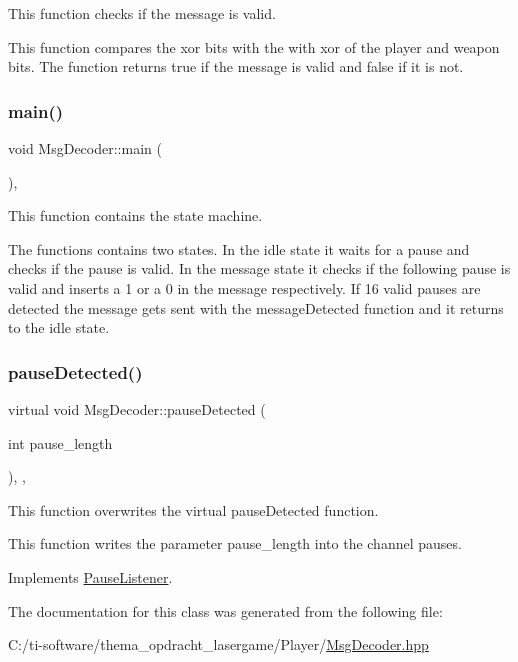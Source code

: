 This function checks if the message is valid. 

This function compares the xor bits with the with xor of the player and weapon bits. The function returns true if the message is valid and false if it is not. \mbox{\label{class_msg_decoder_a0bf9b7579b386b8c9e18a9c606e80604}} 
\subsubsection{\texorpdfstring{main()}{main()}}
{\footnotesize\ttfamily void Msg\+Decoder\+::main (\begin{DoxyParamCaption}{ }\end{DoxyParamCaption})\hspace{0.3cm}{\ttfamily [inline]}, {\ttfamily [override]}}



This function contains the state machine. 

The functions contains two states. In the idle state it waits for a pause and checks if the pause is valid. In the message state it checks if the following pause is valid and inserts a 1 or a 0 in the message respectively. If 16 valid pauses are detected the message gets sent with the message\+Detected function and it returns to the idle state. \mbox{\label{class_msg_decoder_ac83f1179595fbd34295668baf17385fc}} 
\subsubsection{\texorpdfstring{pause\+Detected()}{pauseDetected()}}
{\footnotesize\ttfamily virtual void Msg\+Decoder\+::pause\+Detected (\begin{DoxyParamCaption}\item[{int}]{pause\+\_\+length }\end{DoxyParamCaption})\hspace{0.3cm}{\ttfamily [inline]}, {\ttfamily [override]}, {\ttfamily [virtual]}}



This function overwrites the virtual pause\+Detected function. 

This function writes the parameter pause\+\_\+length into the channel pauses. 

Implements \mbox{\hyperlink{class_pause_listener_ad2a8cbca3aa46215a54b96bfc84cc78b}{Pause\+Listener}}.



The documentation for this class was generated from the following file\+:\begin{DoxyCompactItemize}
\item 
C\+:/ti-\/software/thema\+\_\+opdracht\+\_\+lasergame/\+Player/\mbox{\hyperlink{_msg_decoder_8hpp}{Msg\+Decoder.\+hpp}}\end{DoxyCompactItemize}
